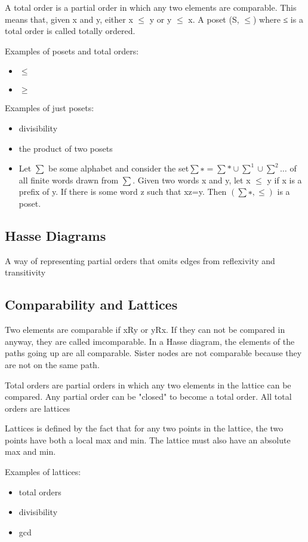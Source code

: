 \documentclass[twoside]{article}
\begin{document}
A total order is a partial order in which any two elements are comparable. This means that, given x and y, either x $\leq$ y or y $\leq$ x. A poset (S, $\leq$) where ≤ is a total order is called totally ordered.

Examples of posets and total orders:

\begin{itemize}
\item $\leq$
\item $\geq$
\end{itemize}


Examples of just posets:

\begin{itemize}
\item divisibility
\item the product of two posets
\item Let $\sum$ be some alphabet and consider the set$\sum ∗ = \sum * \cup  \sum^1 \cup \sum^2 \ldots$ of all finite words drawn from $\sum$. Given two words x and y, let x $\leq$ y if x is a prefix of y. If there is some word z such that xz=y. Then $(\sum ∗, \leq)$ is a poset.
\end{itemize}


\subsection{Hasse Diagrams}
A way of representing partial orders that omits edges from reflexivity and transitivity

\subsection{Comparability and Lattices}
Two elements are comparable if xRy or yRx. If they can not be compared in anyway,
they are called imcomparable. In a Hasse diagram, the elements of the paths going up
are all comparable. Sister nodes are not comparable because they are not on 
the same path.

Total orders are partial orders in which any two elements in the lattice can be 
compared. Any partial order can be "closed" to become a total order. All total orders
are lattices

Lattices is defined by the fact that for any two points in the lattice, the two points
have both a local max and min. The lattice must also have an absolute max and min.


Examples of lattices:

\begin{itemize}
\item total orders
\item divisibility
\item gcd
\end{itemize}
\end{document}
